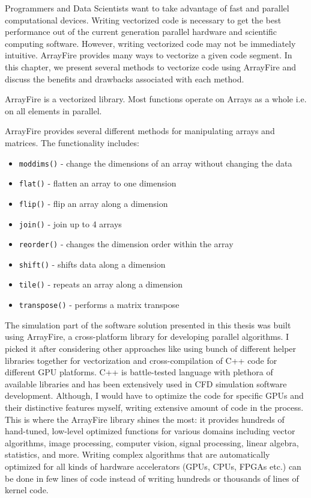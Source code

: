 Programmers and Data Scientists want to take advantage of fast and parallel computational devices. Writing vectorized code is necessary to get the best performance out of the current generation parallel hardware and scientific computing software. However, writing vectorized code may not be immediately intuitive. ArrayFire provides many ways to vectorize a given code segment. In this chapter, we present several methods to vectorize code using ArrayFire and discuss the benefits and drawbacks associated with each method.

ArrayFire is a vectorized library. Most functions operate on Arrays as a whole i.e. on all elements in parallel.

ArrayFire provides several different methods for manipulating arrays and matrices. The functionality includes:

\begin{itemize}
\item \texttt{moddims()} - change the dimensions of an array without changing the data
\item \texttt{flat()}  - flatten an array to one dimension
\item \texttt{flip()}  - flip an array along a dimension
\item \texttt{join()}  - join up to 4 arrays
\item \texttt{reorder()}  - changes the dimension order within the array
\item \texttt{shift()}  - shifts data along a dimension
\item \texttt{tile()}  - repeats an array along a dimension
\item \texttt{transpose()}  - performs a matrix transpose
\end{itemize}

The simulation part of the software solution presented in this thesis was built using ArrayFire, a cross-platform library for developing parallel algorithms. I picked it after considering other approaches like using bunch of different helper libraries together for vectorization and cross-compilation of C++ code for different GPU platforms. C++ is battle-tested language with plethora of available libraries and has been extensively used in CFD simulation software development. Although, I would have to optimize the code for specific GPUs and their distinctive features myself, writing extensive amount of code in the process. This is where the ArrayFire library shines the most: it provides hundreds of hand-tuned, low-level optimized functions for various domains including vector algorithms, image processing, computer vision, signal processing, linear algebra, statistics, and more. Writing complex algorithms that are automatically optimized for all kinds of hardware accelerators (GPUs, CPUs, FPGAs etc.) can be done in few lines of code instead of writing hundreds or thousands of lines of kernel code.

